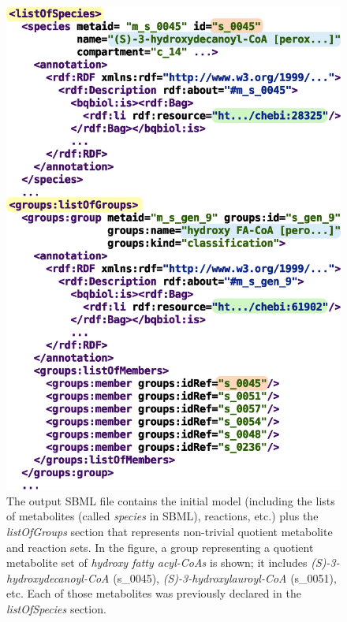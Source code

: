 \documentclass{bmcart}
\begin{document}
\begin{backmatter}
 
      \begin{figure}[h!]
\centering
\includegraphics[scale=1]{figure3.eps}
\caption{
\label{fig:groups}
The output SBML file contains the initial model (including the lists of metabolites (called \emph{species} in SBML), reactions, etc.) plus the \emph{listOfGroups} section that represents non-trivial quotient metabolite and reaction sets. In the figure, a group representing a quotient metabolite set of \emph{hydroxy fatty acyl-CoAs} is shown; it includes \emph{(S)-3-hydroxydecanoyl-CoA} (s\_0045),  \emph{(S)-3-hydroxylauroyl-CoA} (s\_0051), etc. Each of those metabolites was previously declared in the \emph{listOfSpecies} section.}
\end{figure}


\end{backmatter}
\end{document}
